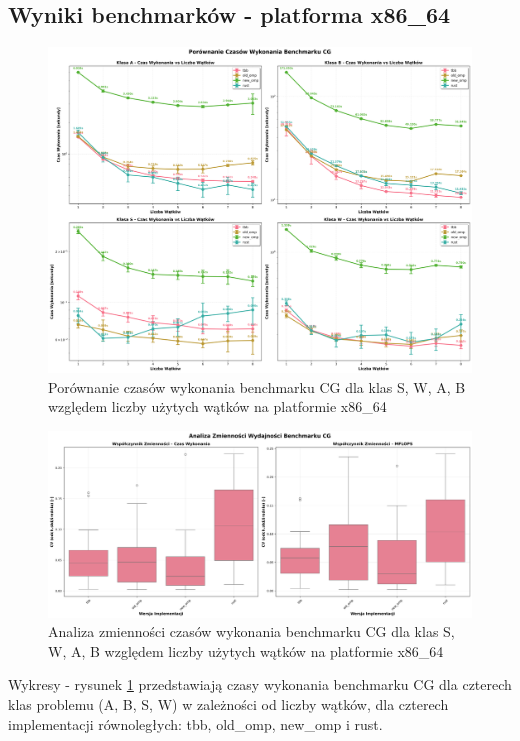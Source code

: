 \subsection{Wyniki benchmarków - platforma x86\_64}
\begin{figure}[H]
    \centering
    \includegraphics[width=\textwidth]{analiza/images/parallel/cg/x86/cg_porownanie_czasow_wykonania.png}
    \caption{Porównanie czasów wykonania benchmarku CG dla klas S, W, A, B względem liczby użytych wątków na platformie x86\_64}
    \label{cg_porownanie_czasow_wykonania_x86_64}
\end{figure}


\begin{figure}[H]
    \centering
    \includegraphics[width=\textwidth]{analiza/images/parallel/cg/x86/cg_analiza_zmiennosci.png}
    \caption{Analiza zmienności czasów wykonania benchmarku CG dla klas S, W, A, B względem liczby użytych wątków na platformie x86\_64}
    \label{cg_analiza_zmiennosci_x86_64}
\end{figure}
Wykresy - rysunek \ref{cg_porownanie_czasow_wykonania_x86_64} przedstawiają czasy wykonania benchmarku CG dla czterech klas problemu (A, B, S, W) w zależności od liczby wątków, dla czterech implementacji równoległych: tbb, old\_omp, new\_omp i rust.

